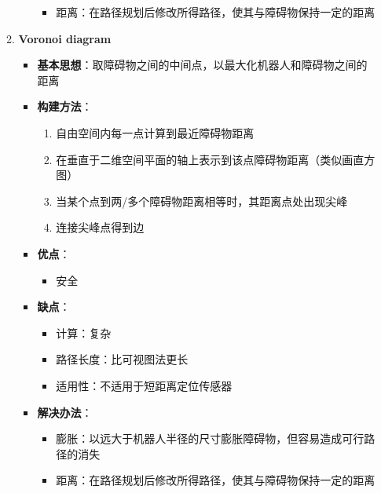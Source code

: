 \documentclass[../main.tex]{subfiles}
\begin{document}
\begin{enumerate}
\begin{enumerate}
\begin{itemize}
\begin{itemize}
                            \item 距离：在路径规划后修改所得路径，使其与障碍物保持一定的距离
                        \end{itemize}
                \end{itemize}
            \item \textbf{Voronoi diagram}\label{item:res:voronoi}
                \begin{itemize}
                    \item \textbf{基本思想}：取障碍物之间的中间点，以最大化机器人和障碍物之间的距离
                    \item \textbf{构建方法}：
                        \begin{enumerate}
                            \item 自由空间内每一点计算到最近障碍物距离
                            \item 在垂直于二维空间平面的轴上表示到该点障碍物距离（类似画直方图）
                            \item 当某个点到两/多个障碍物距离相等时，其距离点处出现尖峰
                            \item 连接尖峰点得到边
                        \end{enumerate}
                    \item \textbf{优点}：
                        \begin{itemize}
                            \item 安全
                        \end{itemize}
                    \item \textbf{缺点}：
                        \begin{itemize}
                            \item 计算：复杂
                            \item 路径长度：比可视图法更长
                            \item 适用性：不适用于短距离定位传感器
                        \end{itemize}
                    \item \textbf{解决办法}：
                        \begin{itemize}
                            \item 膨胀：以远大于机器人半径的尺寸膨胀障碍物，但容易造成可行路径的消失
                            \item 距离：在路径规划后修改所得路径，使其与障碍物保持一定的距离

\end{itemize}
\end{itemize}
\end{enumerate}
\end{enumerate}
\end{document}
